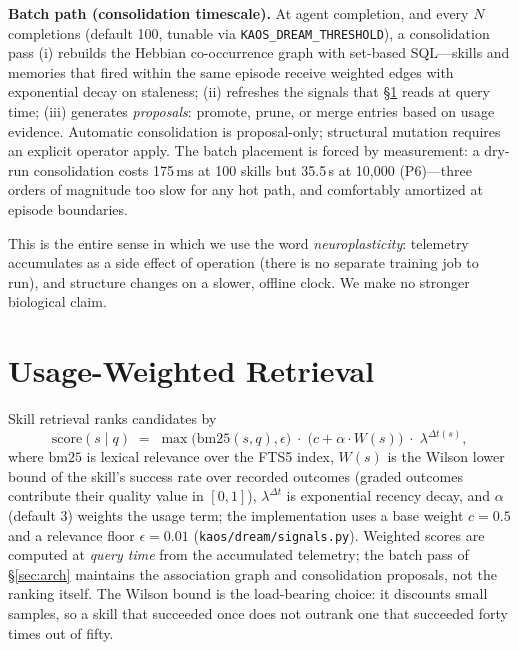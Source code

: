 \documentclass[11pt]{article}
\begin{document}
\textbf{Batch path (consolidation timescale).} At agent completion, and every $N$ completions (default 100, tunable via \texttt{KAOS\_DREAM\_THRESHOLD}), a consolidation pass (i) rebuilds the Hebbian co-occurrence graph with set-based SQL---skills and memories that fired within the same episode receive weighted edges with exponential decay on staleness; (ii) refreshes the signals that \S\ref{sec:retrieval} reads at query time; (iii) generates \emph{proposals}: promote, prune, or merge entries based on usage evidence. Automatic consolidation is proposal-only; structural mutation requires an explicit operator apply. The batch placement is forced by measurement: a dry-run consolidation costs 175\,ms at 100 skills but 35.5\,s at 10{,}000 (P6)---three orders of magnitude too slow for any hot path, and comfortably amortized at episode boundaries.

This is the entire sense in which we use the word \emph{neuroplasticity}: telemetry accumulates as a side effect of operation (there is no separate training job to run), and structure changes on a slower, offline clock. We make no stronger biological claim.

\section{Usage-Weighted Retrieval}
\label{sec:retrieval}

Skill retrieval ranks candidates by
\begin{equation}
\mathrm{score}(s \mid q) \;=\; \max\!\bigl(\mathrm{bm25}(s, q), \epsilon\bigr)\;\cdot\;\bigl(c + \alpha \cdot W(s)\bigr)\;\cdot\; \lambda^{\Delta t(s)},
\label{eq:rank}
\end{equation}
where $\mathrm{bm25}$ is lexical relevance over the FTS5 index, $W(s)$ is the Wilson lower bound \citep{wilson1927probable} of the skill's success rate over recorded outcomes (graded outcomes contribute their quality value in $[0,1]$), $\lambda^{\Delta t}$ is exponential recency decay, and $\alpha$ (default 3) weights the usage term; the implementation uses a base weight $c{=}0.5$ and a relevance floor $\epsilon{=}0.01$ (\texttt{kaos/dream/signals.py}). Weighted scores are computed at \emph{query time} from the accumulated telemetry; the batch pass of \S\ref{sec:arch} maintains the association graph and consolidation proposals, not the ranking itself. The Wilson bound is the load-bearing choice: it discounts small samples, so a skill that succeeded once does not outrank one that succeeded forty times out of fifty.
\end{document}
